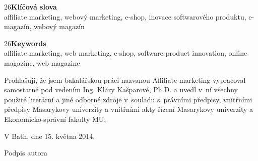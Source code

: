 \documentclass[12pt,oneside,openany]{fithesis}
\begin{document}
\vspace{15mm}

\fontsize{18} {26}\textbf{Klíčová slova}
\vspace{3mm}
      \\affiliate marketing, 
      webový marketing, 
      e-shop,
      inovace softwarového produktu,
      e-magazín,
      webový magazín
       
\vspace{5mm}
    
\fontsize{18} {26}\textbf{Keywords}
\vspace{3mm}
      \\affiliate marketing, 
      web marketing, 
      e-shop,
      software product innovation,
      online magazine,
      web magazine


\begin{ThesisDeclaration} %

\vspace{20mm}

Prohlašuji, že jsem bakalářskou práci nazvanou Affiliate marketing 
vypracoval samostatně 
pod vedením Ing. Kláry Kašparové, Ph.D. a uvedl v ní všechny použité 
literární a jiné odborné 
zdroje v souladu s právními předpisy, vnitřními předpisy Masarykovy 
univerzity a vnitřními akty 
řízení Masarykovy univerzity a Ekonomicko-správní fakulty MU.

\vspace{20mm}

V Bath, dne 15. května 2014. \hspace{40mm}\hrulefill 

\hspace{105mm} Podpis autora

\end{ThesisDeclaration}

\DeclareRobustCommand{\gobblefive}[5]{}
\newcommand*{\SkipTocEntry}{\addtocontents{toc}{\gobblefive}}
\end{document}

